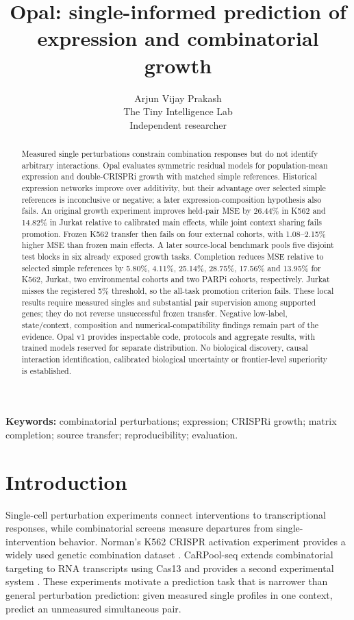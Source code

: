 \documentclass{article}
\title{Opal: single-informed prediction of expression and combinatorial growth}
\author{Arjun Vijay Prakash\\The Tiny Intelligence Lab\\Independent researcher}
\date{}
\begin{document}
\maketitle

\begin{abstract}
Measured single perturbations constrain combination responses but do not identify arbitrary interactions. Opal evaluates symmetric residual models for population-mean expression and double-CRISPRi growth with matched simple references. Historical expression networks improve over additivity, but their advantage over selected simple references is inconclusive or negative; a later expression-composition hypothesis also fails. An original growth experiment improves held-pair MSE by 26.44\% in K562 and 14.82\% in Jurkat relative to calibrated main effects, while joint context sharing fails promotion. Frozen K562 transfer then fails on four external cohorts, with 1.08--2.15\% higher MSE than frozen main effects. A later source-local benchmark pools five disjoint test blocks in six already exposed growth tasks. Completion reduces MSE relative to selected simple references by 5.80\%, 4.11\%, 25.14\%, 28.75\%, 17.56\% and 13.95\% for K562, Jurkat, two environmental cohorts and two PARPi cohorts, respectively. Jurkat misses the registered 5\% threshold, so the all-task promotion criterion fails. These local results require measured singles and substantial pair supervision among supported genes; they do not reverse unsuccessful frozen transfer. Negative low-label, state/context, composition and numerical-compatibility findings remain part of the evidence. Opal v1 provides inspectable code, protocols and aggregate results, with trained models reserved for separate distribution. No biological discovery, causal interaction identification, calibrated biological uncertainty or frontier-level superiority is established.
\end{abstract}
\noindent\textbf{Keywords:} combinatorial perturbations; expression; CRISPRi growth; matrix completion; source transfer; reproducibility; evaluation.

\section{Introduction}
Single-cell perturbation experiments connect interventions to transcriptional responses, while combinatorial screens measure departures from single-intervention behavior. Norman's K562 CRISPR activation experiment provides a widely used genetic combination dataset \citep{norman2019}. CaRPool-seq extends combinatorial targeting to RNA transcripts using Cas13 and provides a second experimental system \citep{wessels2023}. These experiments motivate a prediction task that is narrower than general perturbation prediction: given measured single profiles in one context, predict an unmeasured simultaneous pair.
\end{document}
